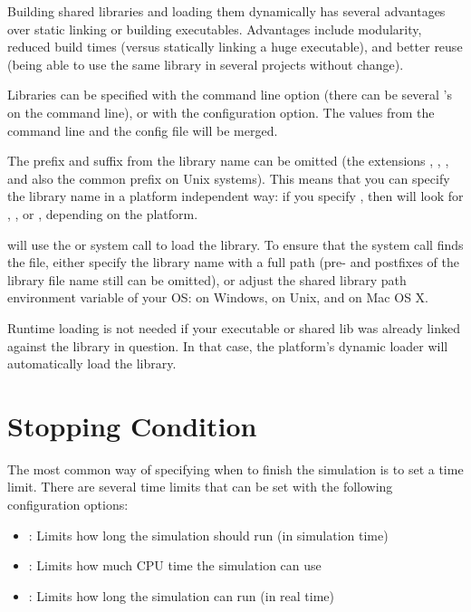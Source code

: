 \begin{hint}
Building shared libraries and loading them dynamically has several
advantages over static linking or building executables. Advantages include
modularity, reduced build times (versus statically linking a huge executable),
and better reuse (being able to use the same library in several projects without
change). 
\end{hint}

Libraries can be specified with the  command line option
(there can be several 's on the command line), or with the  
configuration option. The values from the command line and the config file will
be merged.

The prefix and suffix from the library name can be omitted (the extensions
, , , and also the common  prefix
on Unix systems). This means that you can specify the library name in a
platform independent way: if you specify , then {\opp} will
look for , ,  or ,
depending on the platform.

{\opp} will use the  or  system call to
load the library. To ensure that the system call finds the file, either
specify the library name with a full path (pre- and postfixes of the library 
file name still can be omitted), or adjust the shared library path environment
variable of your OS:  on Windows,  on Unix,
and  on Mac OS X.

\begin{note}
  Runtime loading is not needed if your executable or shared lib was
  already linked against the library in question. In that case,
  the platform's dynamic loader will automatically load the library.
\end{note}


\section{Stopping Condition}
\label{sec:run-sim:stopping-condition}

The most common way of specifying when to finish the simulation is to set a
time limit. There are several time limits that can be set with the following
configuration options:

\begin{itemize}
  \item {} : Limits how long the simulation should run (in simulation time)
  \item {} : Limits how much CPU time the simulation can use
  \item {} : Limits how long the simulation can run (in real time)
\end{itemize}

